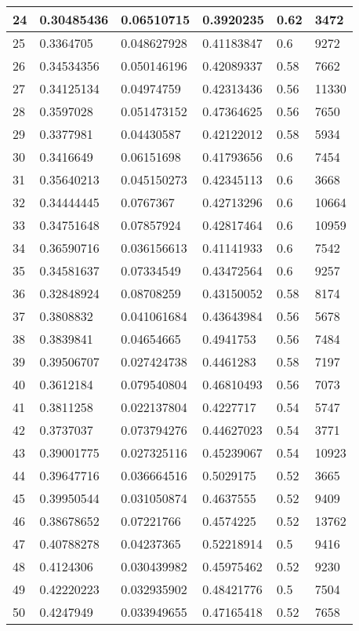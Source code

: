 \begin{longtable}{|l|l|l|l|l|l|}
24 & 0.30485436 & 0.06510715 & 0.3920235 & 0.62 & 3472 \\ \hline 
25 & 0.3364705 & 0.048627928 & 0.41183847 & 0.6 & 9272 \\ \hline 
26 & 0.34534356 & 0.050146196 & 0.42089337 & 0.58 & 7662 \\ \hline 
27 & 0.34125134 & 0.04974759 & 0.42313436 & 0.56 & 11330 \\ \hline 
28 & 0.3597028 & 0.051473152 & 0.47364625 & 0.56 & 7650 \\ \hline 
29 & 0.3377981 & 0.04430587 & 0.42122012 & 0.58 & 5934 \\ \hline 
30 & 0.3416649 & 0.06151698 & 0.41793656 & 0.6 & 7454 \\ \hline 
31 & 0.35640213 & 0.045150273 & 0.42345113 & 0.6 & 3668 \\ \hline 
32 & 0.34444445 & 0.0767367 & 0.42713296 & 0.6 & 10664 \\ \hline 
33 & 0.34751648 & 0.07857924 & 0.42817464 & 0.6 & 10959 \\ \hline 
34 & 0.36590716 & 0.036156613 & 0.41141933 & 0.6 & 7542 \\ \hline 
35 & 0.34581637 & 0.07334549 & 0.43472564 & 0.6 & 9257 \\ \hline 
36 & 0.32848924 & 0.08708259 & 0.43150052 & 0.58 & 8174 \\ \hline 
37 & 0.3808832 & 0.041061684 & 0.43643984 & 0.56 & 5678 \\ \hline 
38 & 0.3839841 & 0.04654665 & 0.4941753 & 0.56 & 7484 \\ \hline 
39 & 0.39506707 & 0.027424738 & 0.4461283 & 0.58 & 7197 \\ \hline 
40 & 0.3612184 & 0.079540804 & 0.46810493 & 0.56 & 7073 \\ \hline 
41 & 0.3811258 & 0.022137804 & 0.4227717 & 0.54 & 5747 \\ \hline 
42 & 0.3737037 & 0.073794276 & 0.44627023 & 0.54 & 3771 \\ \hline 
43 & 0.39001775 & 0.027325116 & 0.45239067 & 0.54 & 10923 \\ \hline 
44 & 0.39647716 & 0.036664516 & 0.5029175 & 0.52 & 3665 \\ \hline 
45 & 0.39950544 & 0.031050874 & 0.4637555 & 0.52 & 9409 \\ \hline 
46 & 0.38678652 & 0.07221766 & 0.4574225 & 0.52 & 13762 \\ \hline 
47 & 0.40788278 & 0.04237365 & 0.52218914 & 0.5 & 9416 \\ \hline 
48 & 0.4124306 & 0.030439982 & 0.45975462 & 0.52 & 9230 \\ \hline 
49 & 0.42220223 & 0.032935902 & 0.48421776 & 0.5 & 7504 \\ \hline 
50 & 0.4247949 & 0.033949655 & 0.47165418 & 0.52 & 7658 \\ \hline 
\end{longtable}